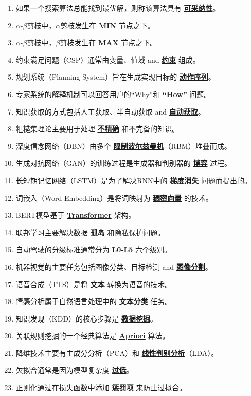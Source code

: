 \documentclass[12pt,a4paper,openany]{ctexbook}
\begin{document}
\begin{enumerate}[leftmargin=2em,itemsep=1pt]
\item 如果一个搜索算法总能找到最优解，则称该算法具有 \underline{\textbf{可采纳性}}。
\item $\alpha$-$\beta$剪枝中，$\alpha$剪枝发生在 \underline{\textbf{MIN}} 节点之下。
\item $\alpha$-$\beta$剪枝中，$\beta$剪枝发生在 \underline{\textbf{MAX}} 节点之下。
\item 约束满足问题（CSP）通常由变量、值域 and \underline{\textbf{约束}} 组成。
\item 规划系统（Planning System）旨在生成实现目标的 \underline{\textbf{动作序列}}。
\item 专家系统的解释机制可以回答用户的“Why”和 \underline{\textbf{“How”}} 问题。
\item 知识获取的方式包括人工获取、半自动获取 and \underline{\textbf{自动获取}}。
\item 粗糙集理论主要用于处理 \underline{\textbf{不精确}} 和不完备的知识。
\item 深度信念网络（DBN）由多个 \underline{\textbf{限制波尔兹曼机}}（RBM）堆叠而成。
\item 生成对抗网络（GAN）的训练过程是生成器和判别器的 \underline{\textbf{博弈}} 过程。
\item 长短期记忆网络（LSTM）是为了解决RNN中的 \underline{\textbf{梯度消失}} 问题而提出的。
\item 词嵌入（Word Embedding）是将词映射为 \underline{\textbf{稠密向量}} 的技术。
\item BERT模型基于 \underline{\textbf{Transformer}} 架构。
\item 联邦学习主要解决数据 \underline{\textbf{孤岛}} 和隐私保护问题。
\item 自动驾驶的分级标准通常分为 \underline{\textbf{L0-L5}} 六个级别。
\item 机器视觉的主要任务包括图像分类、目标检测 and \underline{\textbf{图像分割}}。
\item 语音合成（TTS）是将 \underline{\textbf{文本}} 转换为语音的技术。
\item 情感分析属于自然语言处理中的 \underline{\textbf{文本分类}} 任务。
\item 知识发现（KDD）的核心步骤是 \underline{\textbf{数据挖掘}}。
\item 关联规则挖掘的一个经典算法是 \underline{\textbf{Apriori}} 算法。
\item 降维技术主要有主成分分析（PCA）和 \underline{\textbf{线性判别分析}}（LDA）。
\item 欠拟合通常是因为模型复杂度 \underline{\textbf{过低}}。
\item 正则化通过在损失函数中添加 \underline{\textbf{惩罚项}} 来防止过拟合。

\end{enumerate}
\end{document}
